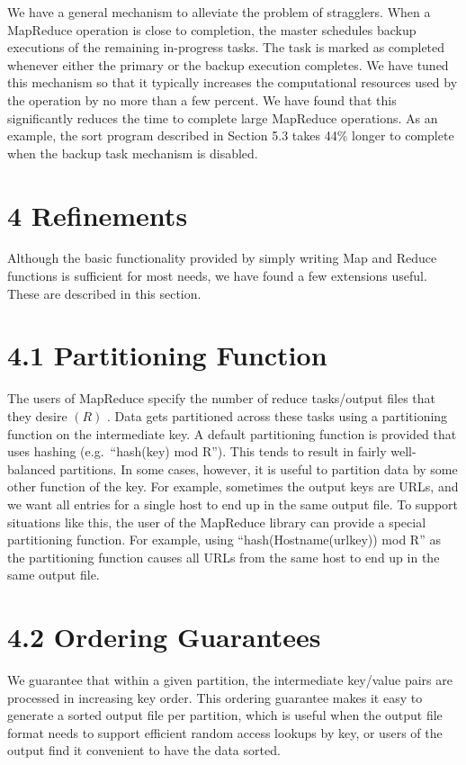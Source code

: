 \documentclass[
]{article}
\begin{document}
We have a general mechanism to alleviate the problem of stragglers. When
a MapReduce operation is close to completion, the master schedules
backup executions of the remaining in-progress tasks. The task is marked
as completed whenever either the primary or the backup execution
completes. We have tuned this mechanism so that it typically increases
the computational resources used by the operation by no more than a few
percent. We have found that this significantly reduces the time to
complete large MapReduce operations. As an example, the sort program
described in Section 5.3 takes 44\% longer to complete when the backup
task mechanism is disabled.

\section{4 Refinements}\label{refinements}

Although the basic functionality provided by simply writing Map and
Reduce functions is sufficient for most needs, we have found a few
extensions useful. These are described in this section.

\section{4.1 Partitioning Function}\label{partitioning-function}

The users of MapReduce specify the number of reduce tasks/output files
that they desire \((R)\) . Data gets partitioned across these tasks
using a partitioning function on the intermediate key. A default
partitioning function is provided that uses hashing (e.g.~``hash(key)
mod R''). This tends to result in fairly well-balanced partitions. In
some cases, however, it is useful to partition data by some other
function of the key. For example, sometimes the output keys are URLs,
and we want all entries for a single host to end up in the same output
file. To support situations like this, the user of the MapReduce library
can provide a special partitioning function. For example, using
``hash(Hostname(urlkey)) mod R'' as the partitioning function causes all
URLs from the same host to end up in the same output file.

\section{4.2 Ordering Guarantees}\label{ordering-guarantees}

We guarantee that within a given partition, the intermediate key/value
pairs are processed in increasing key order. This ordering guarantee
makes it easy to generate a sorted output file per partition, which is
useful when the output file format needs to support efficient random
access lookups by key, or users of the output find it convenient to have
the data sorted.
\end{document}
